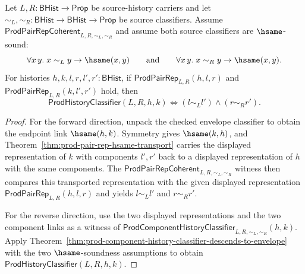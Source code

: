 \begin{theorem}
\label{thm:prod-envelope-displayed-pair-component-exactness}
Let $L,R:\mathsf{BHist}\to\mathsf{Prop}$ be source-history carriers and let
$\sim_L,\sim_R:\mathsf{BHist}\to\mathsf{BHist}\to\mathsf{Prop}$ be source
classifiers. Assume $\mathsf{ProdPairRepCoherent}_{L,R,\sim_L,\sim_R}$ and
assume both source classifiers are $\hsame$-sound:
$$
\forall x\,y.\;x\sim_L y\to\hsame(x,y)
\qquad\hbox{and}\qquad
\forall x\,y.\;x\sim_R y\to\hsame(x,y).
$$
For histories $h,k,l,r,l',r':\mathsf{BHist}$, if
$\mathsf{ProdPairRep}_{L,R}(h,l,r)$ and
$\mathsf{ProdPairRep}_{L,R}(k,l',r')$ hold, then
$$
\mathsf{ProdHistoryClassifier}(L,R,h,k)
\Longleftrightarrow
(l\sim_L l')\wedge(r\sim_R r').
$$
\end{theorem}
\begin{proof}
For the forward direction, unpack the checked envelope classifier to obtain
the endpoint link $\hsame(h,k)$. Symmetry gives $\hsame(k,h)$, and
Theorem~\ref{thm:prod-pair-rep-hsame-transport} carries the displayed
representation of $k$ with components $l',r'$ back to a displayed
representation of $h$ with the same components. The
$\mathsf{ProdPairRepCoherent}_{L,R,\sim_L,\sim_R}$ witness then compares this
transported representation with the given displayed representation
$\mathsf{ProdPairRep}_{L,R}(h,l,r)$ and yields
$l\sim_L l'$ and $r\sim_R r'$.

For the reverse direction, use the two displayed representations and the two
component links as a witness of
$\mathsf{ProdComponentHistoryClassifier}_{L,R,\sim_L,\sim_R}(h,k)$. Apply
Theorem~\ref{thm:prod-component-history-classifier-descends-to-envelope} with
the two $\hsame$-soundness assumptions to obtain
$\mathsf{ProdHistoryClassifier}(L,R,h,k)$.
\end{proof}

